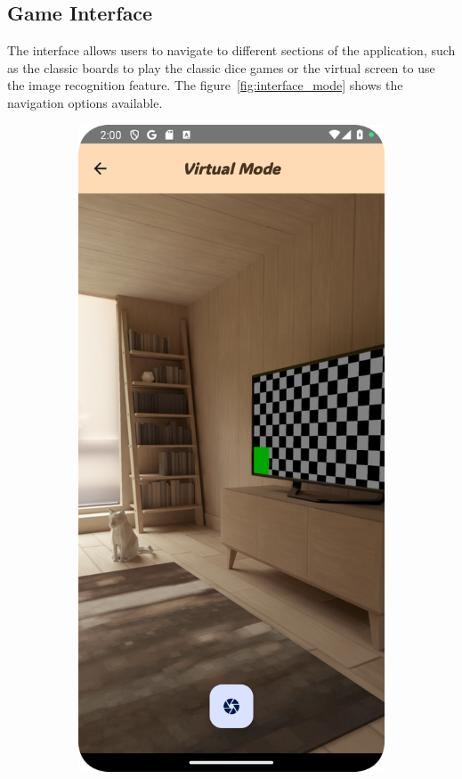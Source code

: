 \subsection{Game Interface}

The interface allows users to navigate to different sections of the application, such as the classic boards to play the classic dice games or the virtual screen to use the image recognition feature. The figure~\ref{fig:interface_mode} shows the navigation options available.

\begin{figure}[h]
    \centering
    \begin{subfigure}[b]{0.27\textwidth}
        \includegraphics[width=\textwidth]{img/virtual mode.png}

\end{subfigure}
\end{figure}

